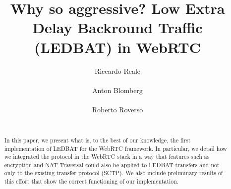 \documentclass{sig-alternate}
\begin{document}


\title{Why so aggressive? Low Extra Delay Backround Traffic (LEDBAT) in WebRTC}


\author{
\alignauthor
Riccardo Reale\\
      \\
\alignauthor
Anton Blomberg\\
      \\
\alignauthor
Roberto Roverso\\
      \\
}

\newcommand{\mysec}[1]{\vspace*{-0.0cm}\section{#1}}
\newcommand{\mysubsec}[1]{\vspace*{-0.0cm}\subsection{#1}\vspace*{0cm}}
\newcommand{\mysubsubsec}[1]{\vspace*{-0.0cm}\subsubsection{#1}\vspace*{0cm}}
\newcommand{\mypar}[1]{\vspace*{-0cm}\paragraph{#1}\vspace*{0cm}}

\maketitle

\begin{abstract}
  In this paper, we present what is, to the best of our knowledge, the first
  implementation of LEDBAT for the WebRTC framework. In particular, we detail how we
  integrated the protocol in the WebRTC stack in a way that features such as encryption
  and NAT Traversal could also be applied to LEDBAT transfers and not only to the existing
  transfer protocol (SCTP). We also include preliminary results of this effort that show
  the correct functioning of our implementation.
\end{abstract}
\end{document}
